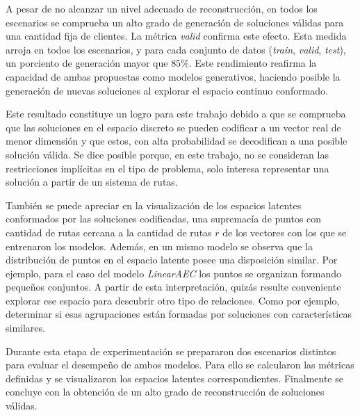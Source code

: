  A pesar de no alcanzar un nivel adecuado de reconstrucción, en todos los escenarios se comprueba un alto grado de generación de soluciones válidas para una cantidad fija de clientes. La métrica \textit{valid} confirma este efecto. Esta medida arroja en todos los escenarios, y para cada conjunto de datos (\textit{train}, \textit{valid}, \textit{test}), un porciento de generación mayor que $85\%$. Este rendimiento reafirma la capacidad de ambas propuestas como modelos generativos, haciendo posible la generación de nuevas soluciones al explorar el espacio continuo conformado.
 
 Este resultado constituye un logro para este trabajo debido a que se comprueba que las soluciones en el espacio discreto se pueden codificar a un vector real de menor dimensión y que estos, con alta probabilidad se decodifican a una posible solución válida. Se dice posible porque, en este trabajo, no se consideran las restricciones implícitas en el tipo de problema, solo interesa representar una solución a partir de un sistema de rutas.
  
 También se puede apreciar en la visualización de los espacios latentes conformados por las soluciones codificadas, una supremacía de puntos con cantidad de rutas cercana a la cantidad de rutas $r$ de los vectores con los que se entrenaron los modelos. Además, en un mismo modelo se observa que la distribución de puntos en el espacio latente posee una disposición similar. Por ejemplo, para el caso del modelo \textit{LinearAEC} los puntos se organizan formando pequeños conjuntos. A partir de esta interpretación, quizás resulte conveniente explorar ese espacio para descubrir otro tipo de relaciones. Como por ejemplo, determinar si esas agrupaciones están formadas por soluciones con características similares. 
 
 Durante esta etapa de experimentación se prepararon dos escenarios distintos para evaluar el desempeño de ambos modelos. Para ello se calcularon las métricas definidas y se visualizaron los espacios latentes correspondientes. Finalmente se concluye con la obtención de un alto grado de reconstrucción de soluciones válidas.
